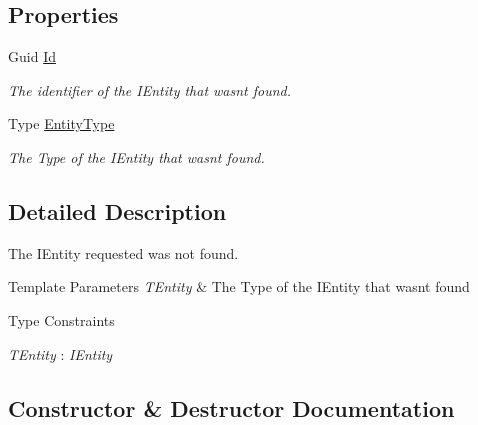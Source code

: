 \subsection*{Properties}
\begin{DoxyCompactItemize}
\item 
Guid \hyperlink{classCqrs_1_1Domain_1_1Exceptions_1_1EntityNotFoundException_a05c674e3e093f80165351b58eec4e39b_a05c674e3e093f80165351b58eec4e39b}{Id}
\begin{DoxyCompactList}\small\item\em The identifier of the I\+Entity that wasn\textquotesingle{}t found. \end{DoxyCompactList}\item 
Type \hyperlink{classCqrs_1_1Domain_1_1Exceptions_1_1EntityNotFoundException_aa3af9a584f16af89e989d86c62a26877_aa3af9a584f16af89e989d86c62a26877}{Entity\+Type}
\begin{DoxyCompactList}\small\item\em The Type of the I\+Entity that wasn\textquotesingle{}t found. \end{DoxyCompactList}\end{DoxyCompactItemize}


\subsection{Detailed Description}
The I\+Entity requested was not found. 


\begin{DoxyTemplParams}{Template Parameters}
{\em T\+Entity} & The Type of the I\+Entity that wasn\textquotesingle{}t found\\
\hline
\end{DoxyTemplParams}
\begin{Desc}
\item[Type Constraints]\begin{description}
\item[{\em T\+Entity} : {\em I\+Entity}]\end{description}
\end{Desc}


\subsection{Constructor \& Destructor Documentation}
\mbox{\label{classCqrs_1_1Domain_1_1Exceptions_1_1EntityNotFoundException_ab62ed57aa319b92b5aebe6b34c69b177_ab62ed57aa319b92b5aebe6b34c69b177}} 
